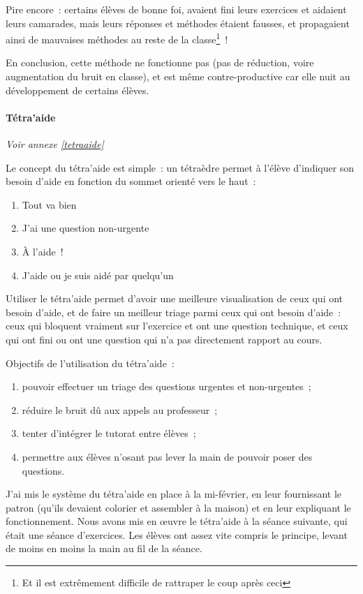 Pire encore : certains élèves de bonne foi, avaient fini leurs exercices et aidaient
leurs camarades, mais leurs réponses et méthodes étaient fausses, et propagaient
ainsi de mauvaises méthodes au reste de la classe\footnote{Et il est extrêmement difficile de
rattraper le coup après ceci} !

En conclusion, cette méthode ne fonctionne pas (pas de réduction, voire augmentation
du bruit en classe), et est même contre-productive car elle nuit au développement
de certains élèves.

\paragraph{Tétra'aide}

\textit{Voir annexe \ref{tetraaide}}

Le concept du tétra'aide est simple : un tétraèdre permet à l'élève d'indiquer
son besoin d'aide en fonction du sommet orienté vers le haut :
\begin{enumerate}
    \item Tout va bien
    \item J'ai une question non-urgente
    \item À l'aide !
    \item J'aide ou je suis aidé par quelqu'un
\end{enumerate}

Utiliser le tétra'aide permet d'avoir une meilleure visualisation de ceux qui ont
besoin d'aide, et de faire un meilleur triage parmi ceux qui ont besoin d'aide :
ceux qui bloquent vraiment sur l'exercice et ont une question technique, et ceux
qui ont fini ou ont une question qui n'a pas directement rapport au cours.

Objectifs de l'utilisation du tétra'aide :
\begin{enumerate}
    \item pouvoir effectuer un triage des questions urgentes et non-urgentes ;
    \item réduire le bruit dû aux appels au professeur ;
    \item tenter d'intégrer le tutorat entre élèves ;
    \item permettre aux élèves n'osant pas lever la main de pouvoir poser des questions.
\end{enumerate}

J'ai mis le système du tétra'aide en place à la mi-février, en leur fournissant
le patron (qu'ils devaient colorier et assembler à la maison) et en leur expliquant
le fonctionnement. Nous avons mis en œuvre le tétra'aide à la séance suivante,
qui était une séance d'exercices. Les élèves ont assez vite compris le principe,
levant de moins en moins la main au fil de la séance.

